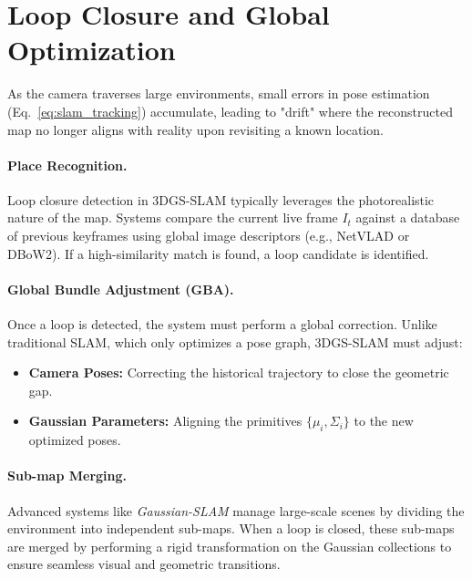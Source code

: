 \section{Loop Closure and Global Optimization}
\label{sec:opti}

As the camera traverses large environments, small errors in pose estimation (Eq.~\ref{eq:slam_tracking}) accumulate, leading to "drift" where the reconstructed map no longer aligns with reality upon revisiting a known location.
\paragraph{Place Recognition.}
Loop closure detection in 3DGS-SLAM typically leverages the photorealistic nature of the map. Systems compare the current live frame $I_t$ against a database of previous keyframes using global image descriptors (e.g., NetVLAD or DBoW2). If a high-similarity match is found, a loop candidate is identified.
\paragraph{Global Bundle Adjustment (GBA).}
Once a loop is detected, the system must perform a global correction. Unlike traditional SLAM, which only optimizes a pose graph, 3DGS-SLAM must adjust:
\begin{itemize}
    \item \textbf{Camera Poses:} Correcting the historical trajectory to close the geometric gap. 
    \item \textbf{Gaussian Parameters:} Aligning the primitives $\{\mu_i, \Sigma_i\}$ to the new optimized poses. 
\end{itemize}
\paragraph{Sub-map Merging.}
Advanced systems like \textit{Gaussian-SLAM} manage large-scale scenes by dividing the environment into independent sub-maps. When a loop is closed, these sub-maps are merged by performing a rigid transformation on the Gaussian collections to ensure seamless visual and geometric transitions.